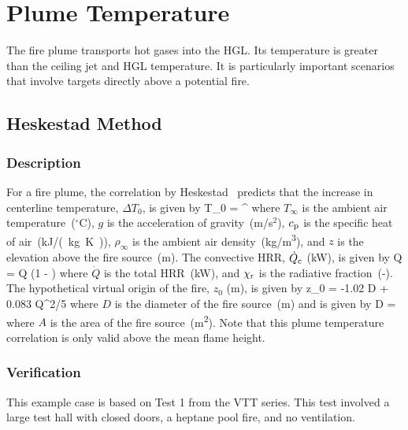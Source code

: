 
\chapter{Plume Temperature}
\label{Plume_Chapter}

The fire plume transports hot gases into the HGL. Its temperature is greater than the ceiling jet and HGL temperature. It is particularly important scenarios that involve targets directly above a potential fire.

\section{Heskestad Method}

\subsection*{Description}

For a fire plume, the correlation by Heskestad~\cite{SFPE:Heskestad} predicts that the increase in centerline temperature, $\Delta T_0$, is given by
\be
\Delta T_0 =  \quad ^
\label{eq:Heskestad}
\ee
where $T_\infty$ is the ambient air temperature~($^\circ$C), $g$ is the acceleration of gravity~(m/s$^2$), $c\sb{p}$ is the specific heat of air~(\si{kJ/(kg.K)}), $\rho_{\infty}$ is the ambient air density~(\si{kg/m^3}), and $z$ is the elevation above the fire source~(\si{m}). The convective HRR, $\dot Q\sb{c}$ (\si{kW}), is given by
\be
\dot Q = \dot Q (1 - \chi{})
\label{eq:Heskestad_Qc}
\ee
where $\dot Q$ is the total HRR~(\si{kW}), and $\chi\sb{r}$ is the radiative fraction~(-). The hypothetical virtual origin of the fire, $z_0$ (\si{m}), is given by
\be
z_0 = -1.02 D + 0.083 \dot Q^{2/5}
\label{eq:Heskestad_z0}
\ee
where $D$ is the diameter of the fire source~(\si{m}) and is given by
\be
D = 
\label{eq:Heskestad_D}
\ee
where $A$ is the area of the fire source~(\si{m^2}).
Note that this plume temperature correlation is only valid above the mean flame height.


\clearpage


\subsection*{Verification}

This example case is based on Test 1 from the VTT series. This test involved a large test hall with closed doors, a heptane pool fire, and no ventilation.

